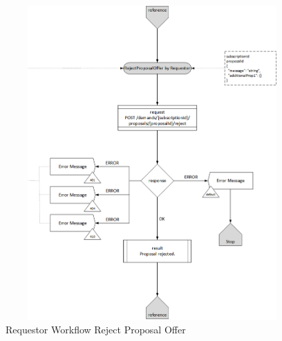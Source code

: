 \begin{enumerate}
\begin{figure}[htbp]
    \centering
    \includegraphics[width=12cm,height=12cm,angle=0]{./diag/Workflow/Market/RejectProposalOffer-R-Workflow.png}
    \caption{Requestor Workflow Reject Proposal Offer }
	\label{fig:RPO}
\end{figure}


\end{enumerate}

\newpage